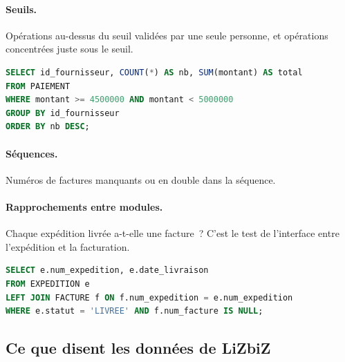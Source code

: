 \paragraph{Seuils.} Opérations au-dessus du seuil validées par une seule
personne, et opérations concentrées juste sous le seuil.
\begin{lstlisting}[language=SQL]
SELECT id_fournisseur, COUNT(*) AS nb, SUM(montant) AS total
FROM PAIEMENT
WHERE montant >= 4500000 AND montant < 5000000
GROUP BY id_fournisseur
ORDER BY nb DESC;
\end{lstlisting}

\paragraph{Séquences.} Numéros de factures manquants ou en double dans la
séquence.

\paragraph{Rapprochements entre modules.} Chaque expédition livrée a-t-elle
une facture~? C'est le test de l'interface entre l'expédition et la
facturation.
\begin{lstlisting}[language=SQL]
SELECT e.num_expedition, e.date_livraison
FROM EXPEDITION e
LEFT JOIN FACTURE f ON f.num_expedition = e.num_expedition
WHERE e.statut = 'LIVREE' AND f.num_facture IS NULL;
\end{lstlisting}

\subsection{Ce que disent les données de LiZbiZ}

